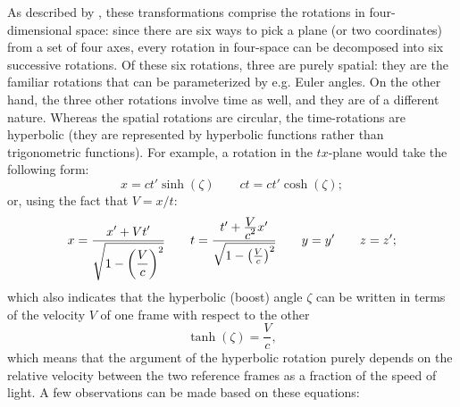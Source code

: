 As described by \citet{Landau1971}, these transformations comprise the rotations in four-dimensional space: since there are six ways to pick a plane (or two coordinates) from a set of four axes, every rotation in four-space can be decomposed into six successive rotations. Of these six rotations, three are purely spatial: they are the familiar rotations that can be parameterized by e.g. Euler angles. On the other hand, the three other rotations involve time as well, and they are of a different nature. Whereas the spatial rotations are circular, the time-rotations are hyperbolic (they are represented by hyperbolic functions rather than trigonometric functions). For example, a rotation in the \(tx\)-plane would take the following form:
\begin{equation}
    x = ct'\sinh(\zeta)\qquad ct = ct'\cosh(\zeta);
    \label{eq:lorentz_transform_hyp}
\end{equation}
or, using the fact that \(V = x/t\):
\begin{equation}
    x = \frac{\displaystyle x' + Vt'}{\displaystyle \sqrt{1 - \qty(\frac{V}{c})^2}} \qquad t = \frac{t' + \frac{\displaystyle V}{\displaystyle c^2}x'}{\sqrt{1 - \qty(\frac{V}{c})^2}} \qquad y = y' \qquad z = z';
    \label{eq:lorentz_transform_sqrt}
\end{equation}
which also indicates that the hyperbolic (boost) angle \(\zeta\) can be written in terms of the velocity \(V\) of one frame with respect to the other
\[ \tanh(\zeta) = \frac{V}{c},\]
which means that the argument of the hyperbolic rotation purely depends on the relative velocity between the two reference frames as a fraction of the speed of light. A few observations can be made based on these equations: 
